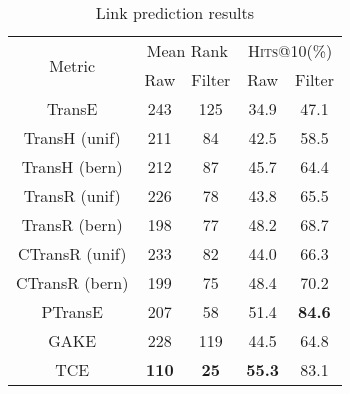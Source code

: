 \begin{table} %
  \caption{Link prediction results}
  \label{table_link_prediction_results}
  \begin{tabular}{c|cc|cc}
    \hline
    \multirow{2}{*}{Metric}  & \multicolumn{2}{c|}{Mean Rank} & \multicolumn{2}{c}{\textsc{Hits}@10(\%)} \\
                             & Raw          & Filter          & Raw           & Filter          \\
    \hline
    TransE                   & 243          & 125             & 34.9          & 47.1            \\
    TransH (unif)            & 211          & 84              & 42.5          & 58.5            \\
    TransH (bern)            & 212          & 87              & 45.7          & 64.4            \\
    TransR (unif)            & 226          & 78              & 43.8          & 65.5            \\
    TransR (bern)            & 198          & 77              & 48.2          & 68.7            \\
    CTransR (unif)           & 233          & 82              & 44.0          & 66.3            \\
    CTransR (bern)           & 199          & 75              & 48.4          & 70.2            \\
    PTransE                  & 207          & 58              & 51.4          & \textbf{84.6}   \\
    GAKE                     & 228          & 119             & 44.5          & 64.8            \\
    \hline
    TCE                      & \textbf{110} & \textbf{25}     & \textbf{55.3} & 83.1            \\
    \hline
  \end{tabular}
\end{table}


